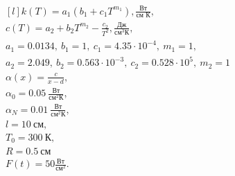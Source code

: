 \begin{equation*}
    \begin{matrix*}[l]
        k(T) = a_1(b_1 + c_1 T^{m_1}), \frac{\text{Вт}}{\text{см К}}, \\
        c(T) = a_2 + b_2 T^{m_2} - \frac{c_2}{T^2}, \frac{\text{Дж}}{\text{см}^3 \text{К}}, \\
        a_1 = 0.0134,\ b_1 = 1,\ c_1 = 4.35 \cdot 10^{-4},\ m_1=1, \\
        a_2 = 2.049,\ b_2 = 0.563 \cdot 10^{-3},\ c_2 = 0.528 \cdot 10^5,\ m_2 = 1 \\
        \alpha(x) = \frac{c}{x-d}, \\
        \alpha_0 = 0.05\ \frac{\text{Вт}}{\text{см}^2 \text{К}}, \\
        \alpha_N = 0.01\ \frac{\text{Вт}}{\text{см}^2 \text{К}}, \\
        l = 10\ \text{см}, \\
        T_0 = 300\ \text{К}, \\
        R = 0.5\ \text{см} \\
        F(t) = 50 \frac{\text{Вт}}{\text{см}^2}.
    \end{matrix*}
\end{equation*}
